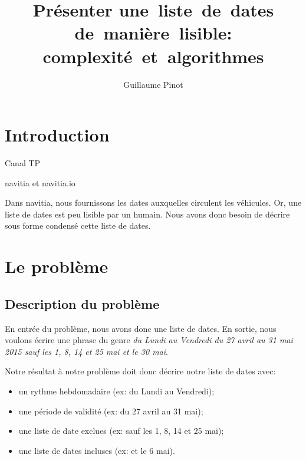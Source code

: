 \documentclass{roadef}
\begin{document}
\title{Présenter une~liste~de~dates de~manière~lisible: complexité~et~algorithmes}

\def\shorttitle{Présenter une~liste~de~dates de~manière~lisible}

\author{Guillaume Pinot}

{}

\maketitle
\thispagestyle{empty}



\section{Introduction}

Canal TP

navitia et navitia.io

Dans navitia, nous fournissons les dates auxquelles circulent les
véhicules.  Or, une liste de dates est peu lisible par un humain. Nous
avons donc besoin de décrire sous forme condensé cette liste de dates.

\section{Le problème}

\subsection{Description du problème}

En entrée du problème, nous avons donc une liste de dates.  En sortie,
nous voulons écrire une phrase du genre \emph{du Lundi au Vendredi du
  27 avril au 31 mai 2015 sauf les 1, 8, 14 et 25 mai et le 30 mai}.

Notre résultat à notre problème doit donc décrire notre liste de dates
avec:
\begin{itemize}
\item un rythme hebdomadaire (ex: du Lundi au Vendredi);
\item une période de validité (ex: du 27 avril au 31 mai);
\item une liste de date exclues (ex: sauf les 1, 8, 14 et 25 mai);
\item une liste de dates incluses (ex: et le 6 mai).
\end{itemize}
\end{document}
